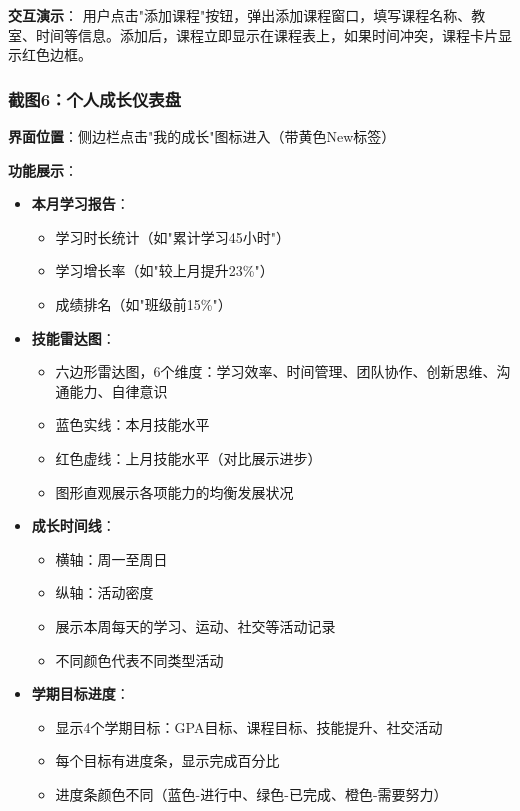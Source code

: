 \documentclass[12pt,a4paper]{article}
\begin{document}
\textbf{交互演示}：
用户点击"添加课程"按钮，弹出添加课程窗口，填写课程名称、教室、时间等信息。添加后，课程立即显示在课程表上，如果时间冲突，课程卡片显示红色边框。

\subsubsection{截图6：个人成长仪表盘}

\textbf{界面位置}：侧边栏点击"我的成长"图标进入（带黄色New标签）

\textbf{功能展示}：
\begin{itemize}
    \item \textbf{本月学习报告}：
        \begin{itemize}
            \item 学习时长统计（如"累计学习45小时"）
            \item 学习增长率（如"较上月提升23\%"）
            \item 成绩排名（如"班级前15\%"）
        \end{itemize}
    \item \textbf{技能雷达图}：
        \begin{itemize}
            \item 六边形雷达图，6个维度：学习效率、时间管理、团队协作、创新思维、沟通能力、自律意识
            \item 蓝色实线：本月技能水平
            \item 红色虚线：上月技能水平（对比展示进步）
            \item 图形直观展示各项能力的均衡发展状况
        \end{itemize}
    \item \textbf{成长时间线}：
        \begin{itemize}
            \item 横轴：周一至周日
            \item 纵轴：活动密度
            \item 展示本周每天的学习、运动、社交等活动记录
            \item 不同颜色代表不同类型活动
        \end{itemize}
    \item \textbf{学期目标进度}：
        \begin{itemize}
            \item 显示4个学期目标：GPA目标、课程目标、技能提升、社交活动
            \item 每个目标有进度条，显示完成百分比
            \item 进度条颜色不同（蓝色-进行中、绿色-已完成、橙色-需要努力）
        \end{itemize}
\end{itemize}
\end{document}
